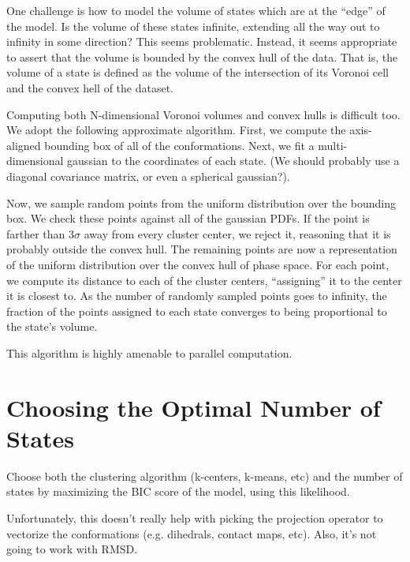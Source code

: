 \documentclass[twocolumn,floatfix,nofootinbib,aps]{revtex4-1}
\begin{document}
One challenge is how to model the volume of states which are at the
``edge'' of the model. Is the volume of these states infinite, extending
all the way out to infinity in some direction? This seems problematic.
Instead, it seems appropriate to assert that the volume is bounded by
the convex hull of the data. That is, the volume of a state is defined
as the volume of the intersection of its Voronoi cell and the convex
hell of the dataset.

Computing both N-dimensional Voronoi volumes and convex hulls is
difficult too. We adopt the following approximate algorithm. First, we
compute the axis-aligned bounding box of all of the conformations. Next,
we fit a multi-dimensional gaussian to the coordinates of each state.
(We should probably use a diagonal covariance matrix, or even a
spherical gaussian?).

Now, we sample random points from the uniform distribution over the
bounding box. We check these points against all of the gaussian PDFs. If
the point is farther than $3\sigma$ away from every cluster
center, we reject it, reasoning that it is probably outside the convex
hull. The remaining points are now a representation of the uniform
distribution over the convex hull of phase space. For each point, we
compute its distance to each of the cluster centers, ``assigning'' it to
the center it is closest to. As the number of randomly sampled points
goes to infinity, the fraction of the points assigned to each state
converges to being proportional to the state's volume.

This algorithm is highly amenable to parallel computation.

\section{Choosing the Optimal Number of States}

Choose both the clustering algorithm (k-centers, k-means, etc) and the
number of states by maximizing the BIC score of the model, using this
likelihood.

Unfortunately, this doesn't really help with picking the projection operator
to vectorize the conformations (e.g. dihedrals, contact maps, etc). Also,
it's not going to work with RMSD.


\end{document}
